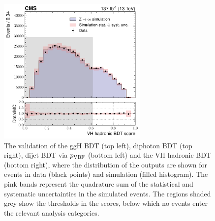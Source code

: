 \begin{figure}[htbp]
  \hfill
  \includegraphics[height=7.25cm]{Figures/hgg_overview/DYValidation_VHBDT_VH_had_mvascore_ratioPlot.pdf}
  \caption[Validation of the event categorisation classifiers]
  {
    The validation of the ggH BDT (top left), diphoton BDT (top right), dijet BDT via $p_{\rm{VBF}}$ (bottom left) and the VH hadronic BDT (bottom right), where the distribution of the outputs are shown for \Zee events in data (black points) and simulation (filled histogram). The pink bands represent the quadrature sum of the statistical and systematic uncertainties in the simulated events. The regions shaded grey show the thresholds in the scores, below which no events enter the relevant analysis categories.
  }
  \label{fig:categorisation_validation}
\end{figure}


